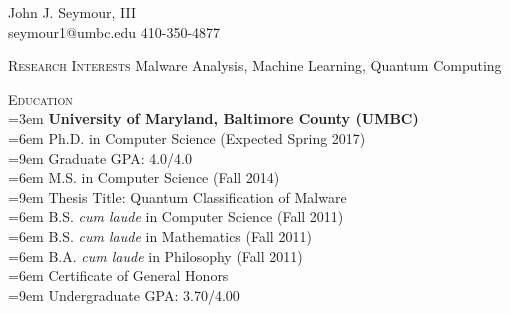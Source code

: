 \pagestyle{headings}
\newcommand{\tab}{\hspace*{3em}}
\newcommand{\atab}{\hangindent=3em \hangafter=0}
\newcommand{\btab}{\hangindent=6em \hangafter=0}
\newcommand{\ctab}{\hangindent=9em \hangafter=0}
\newcommand{\untab}{\hspace*{-3em}}

\newenvironment{my_list}
{\begin{itemize}
    \vspace{-4mm}
    \setlength{\itemsep}{0pt}
    \setlength{\itemindent}{6em}
    \setlength{\parskip}{0pt}
    \setlength{\parsep}{0pt}}
{\end{itemize}}

\oddsidemargin  -0.4in
\textwidth      7in
\topmargin  -0.5in
\headheight 0.0in
\headsep    0.0in
\textheight 11.0in


\centering
\LARGE \untab John J. Seymour, III\\
\normalsize
\medskip
\untab \untab seymour1@umbc.edu \tab \tab 410-350-4877\\
\medskip
\hline
\bigskip

\raggedright
\textsc{Research Interests} \tab Malware Analysis, Machine Learning, Quantum Computing\\
\medskip

\textsc{Education}\\
\atab \textbf{University of Maryland, Baltimore County (UMBC)}\\
\btab Ph.D. in Computer Science (Expected Spring 2017)\\
\ctab Graduate GPA: 4.0/4.0\\
\btab M.S. in Computer Science (Fall 2014)\\
\ctab Thesis Title: Quantum Classification of Malware\\
\btab B.S. \emph{cum laude} in Computer Science (Fall 2011)\\
\btab B.S. \emph{cum laude} in Mathematics (Fall 2011) \\
\btab B.A. \emph{cum laude} in Philosophy (Fall 2011)\\
\btab Certificate of General Honors\\
\ctab Undergraduate GPA: 3.70/4.00\\
\bigskip

